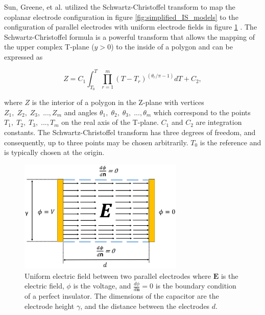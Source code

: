     \par Sun, Greene, et al. utilized the Schwartz-Christoffel transform to map the coplanar electrode configuration in figure \ref{fig:simplified_IS_models} to the configuration of parallel electrodes with uniform electrode fields in figure \ref{fig:parallelCapacitorModel} \cite{sun_analytical_2007}. The Schwartz-Christoffel formula is a powerful transform that allows the mapping of the upper complex T-plane ($y>0$) to the inside of a polygon and can be expressed as
    
    \begin{equation}
        Z = C_1 \int_{T_0}^T \prod^m_{r=1} (T - T_r)^{(\theta_r/\pi - 1)} dT + C_2,
    \end{equation}
    
    \noindent where $Z$ is the interior of a polygon in the Z-plane with vertices $Z_1,\;Z_2,\;Z_3,\; ...,Z_m$ and angles $\theta_1,\;\theta_2,\;\theta_3,\; ...,\theta_m$ which correspond to the points $T_1,\;T_2,\;T_3,\; ...,T_m$ on the real axis of the T-plane. $C_1$ and $C_2$ are integration constants. The Schwartz-Christoffel transform has three degrees of freedom, and consequently, up to three points may be chosen arbitrarily. $T_0$ is the reference and is typically chosen at the origin.
    
       \begin{figure}[h]
        \centering
        \includegraphics[width=0.7\textwidth]{images/capacitorNoFringe.png}
        \caption[Uniform electric field between parallel plates]{Uniform electric field between two parallel electrodes where $\boldsymbol{E}$ is the electric field, $\phi$ is the voltage, and $\frac{d\phi}{d\boldsymbol{n}}=0$ is the boundary condition of a perfect insulator. The dimensions of the capacitor are the electrode height $\gamma$, and the distance between the electrodes $d$.}
        \label{fig:parallelCapacitorModel}
  \end{figure}
    
